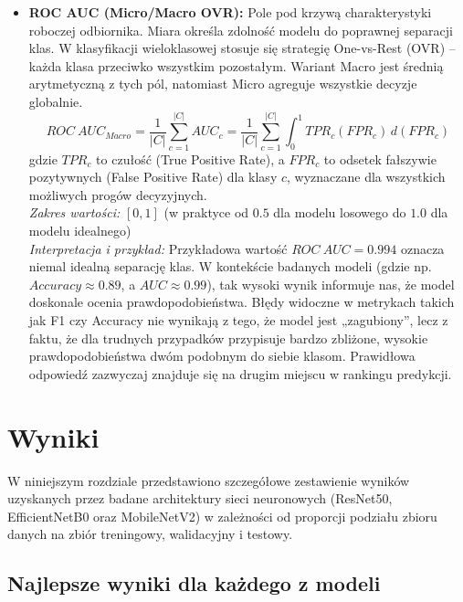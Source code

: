 \documentclass[12pt,a4paper]{article}
\begin{document}
\begin{itemize}
            
        \item \textbf{ROC AUC (Micro/Macro OVR):} Pole pod krzywą charakterystyki roboczej odbiornika. Miara określa zdolność modelu do poprawnej separacji klas. W klasyfikacji wieloklasowej stosuje się strategię One-vs-Rest (OVR) -- każda klasa przeciwko wszystkim pozostałym. 
        Wariant Macro jest średnią arytmetyczną z tych pól, natomiast Micro agreguje wszystkie decyzje globalnie.\\ 
        \begin{equation}
            ROC\ AUC_{Macro} = \frac{1}{|C|} \sum_{c=1}^{|C|} AUC_c = \frac{1}{|C|} \sum_{c=1}^{|C|} \int_{0}^{1} TPR_c(FPR_c) \, d(FPR_c)
        \label{eq:roc_auc_macro}
        \end{equation}
        gdzie $TPR_c$ to czułość (True Positive Rate), a $FPR_c$ to odsetek fałszywie pozytywnych (False Positive Rate) dla klasy $c$, wyznaczane dla wszystkich możliwych progów decyzyjnych.\\
        \textit{Zakres wartości:} $[0, 1]$ (w praktyce od $0.5$ dla modelu losowego do $1.0$ dla modelu idealnego)\\
        \textit{Interpretacja i przykład:} Przykładowa wartość $ROC\ AUC = 0.994$ oznacza niemal idealną separację klas. W kontekście badanych modeli (gdzie np. $Accuracy \approx 0.89$, a $AUC \approx 0.99$), tak wysoki wynik informuje nas, że model doskonale ocenia prawdopodobieństwa. Błędy widoczne w metrykach takich jak F1 czy Accuracy nie wynikają z tego, że model jest „zagubiony”, lecz z faktu, że dla trudnych przypadków przypisuje bardzo zbliżone, wysokie prawdopodobieństwa dwóm podobnym do siebie klasom. Prawidłowa odpowiedź zazwyczaj znajduje się na drugim miejscu w rankingu predykcji.
\end{itemize}

\section{Wyniki}

W niniejszym rozdziale przedstawiono szczegółowe zestawienie wyników uzyskanych przez badane architektury sieci neuronowych (ResNet50, EfficientNetB0 oraz MobileNetV2) w zależności od proporcji podziału zbioru danych na zbiór treningowy, walidacyjny i testowy.

\subsection{Najlepsze wyniki dla każdego z modeli}
\end{document}
